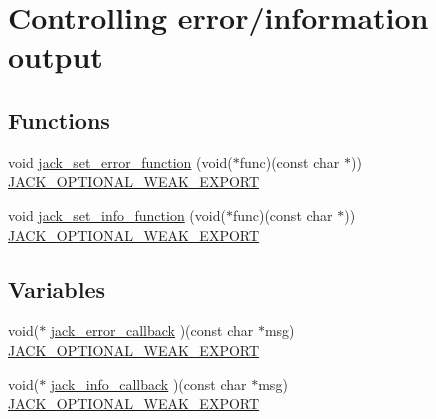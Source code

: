 \hypertarget{group__ErrorOutput}{\section{\-Controlling error/information output}
\label{d2/dd9/group__ErrorOutput}
}
\subsection*{\-Functions}
\begin{DoxyCompactItemize}
\item 
void \hyperlink{group__ErrorOutput_ga550faaef2bb17b03b0068fe094e7b92f}{jack\-\_\-set\-\_\-error\-\_\-function} (void($\ast$func)(const char $\ast$)) \hyperlink{weakmacros_8h_adf1bde0dd996bbf61a44311165014dd1}{\-J\-A\-C\-K\-\_\-\-O\-P\-T\-I\-O\-N\-A\-L\-\_\-\-W\-E\-A\-K\-\_\-\-E\-X\-P\-O\-R\-T}
\item 
void \hyperlink{group__ErrorOutput_ga1555b7b4ae4056a42c70a3fa278ae17f}{jack\-\_\-set\-\_\-info\-\_\-function} (void($\ast$func)(const char $\ast$)) \hyperlink{weakmacros_8h_adf1bde0dd996bbf61a44311165014dd1}{\-J\-A\-C\-K\-\_\-\-O\-P\-T\-I\-O\-N\-A\-L\-\_\-\-W\-E\-A\-K\-\_\-\-E\-X\-P\-O\-R\-T}
\end{DoxyCompactItemize}
\subsection*{\-Variables}
\begin{DoxyCompactItemize}
\item 
void($\ast$ \hyperlink{group__ErrorOutput_gadabaab075f11a7149f8bc3143d638780}{jack\-\_\-error\-\_\-callback} )(const char $\ast$msg) \hyperlink{weakmacros_8h_adf1bde0dd996bbf61a44311165014dd1}{\-J\-A\-C\-K\-\_\-\-O\-P\-T\-I\-O\-N\-A\-L\-\_\-\-W\-E\-A\-K\-\_\-\-E\-X\-P\-O\-R\-T}
\item 
void($\ast$ \hyperlink{group__ErrorOutput_ga4fd590171478e9ef1c0686c8911041b7}{jack\-\_\-info\-\_\-callback} )(const char $\ast$msg) \hyperlink{weakmacros_8h_adf1bde0dd996bbf61a44311165014dd1}{\-J\-A\-C\-K\-\_\-\-O\-P\-T\-I\-O\-N\-A\-L\-\_\-\-W\-E\-A\-K\-\_\-\-E\-X\-P\-O\-R\-T}
\end{DoxyCompactItemize}


